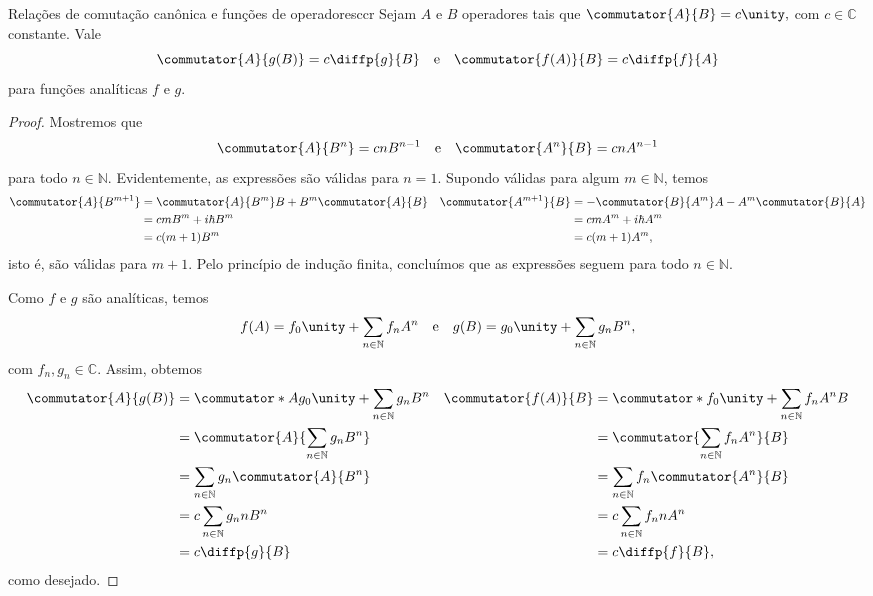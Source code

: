 \begin{lemma}{Relações de comutação canônica e funções de operadores}{ccr}
    Sejam \(A\) e \(B\) operadores tais que \(\commutator{A}{B} = c \unity,\) com \(c \in \mathbb{C}\) constante. Vale
    \begin{equation*}
        \commutator{A}{g(B)} = c \diffp{g}{B}
        \quad\text{e}\quad
        \commutator{f(A)}{B} = c \diffp{f}{A}
    \end{equation*}
    para funções analíticas \(f\) e \(g\).
\end{lemma}
\begin{proof}
    Mostremos que
    \begin{equation*}
        \commutator{A}{B^n} = c n B^{n - 1}
        \quad\text{e}\quad
        \commutator{A^n}{B} = c n A^{n-1}
    \end{equation*}
    para todo \(n \in \mathbb{N}\). Evidentemente, as expressões são válidas para \(n = 1\). Supondo válidas para algum \(m \in \mathbb{N}\), temos 
    \begin{align*}
        \commutator{A}{B^{m+1}} &= \commutator{A}{B^m}B + B^m\commutator{A}{B}&
        \commutator{A^{m+1}}{B} &= -\commutator{B}{A^m}A - A^m\commutator{B}{A}\\
                                &= c m B^m + i\hbar B^m&
                                &= c m A^m + i \hbar A^m\\
                                &= c (m+1) B^m&
                                &= c (m + 1) A^m,
    \end{align*}
    isto é, são válidas para \(m+1.\) Pelo princípio de indução finita, concluímos que as expressões seguem para todo \(n \in \mathbb{N}\).

    Como \(f\) e \(g\) são analíticas, temos
    \begin{equation*}
        f(A) = f_0 \unity + \sum_{n \in \mathbb{N}} f_n A^n
        \quad\text{e}\quad
        g(B) = g_0 \unity + \sum_{n \in \mathbb{N}} g_n B^n,
    \end{equation*}
    com \(f_n, g_n \in \mathbb{C}\). Assim, obtemos
    \begin{align*}
        \commutator{A}{g(B)} &= \commutator*{A}{g_0 \unity + \sum_{n \in \mathbb{N}} g_n B^n} &
        \commutator{f(A)}{B} &= \commutator*{f_0 \unity + \sum_{n \in \mathbb{N}} f_n A^n}{B}\\
                             &= \commutator{A}{\sum_{n \in \mathbb{N}} g_n B^n} &
                             &= \commutator{\sum_{n \in \mathbb{N}} f_n A^n}{B} \\
                             &= \sum_{n \in \mathbb{N}} g_n \commutator{A}{B^n} &
                             &= \sum_{n \in \mathbb{N}} f_n \commutator{A^n}{B} \\
                             &= c \sum_{n \in \mathbb{N}} g_n n B^n &
                             &= c \sum_{n \in \mathbb{N}} f_n n A^n \\
                             &= c \diffp{g}{B}&
                             &= c \diffp{f}{B},
    \end{align*}
    como desejado.
\end{proof}
